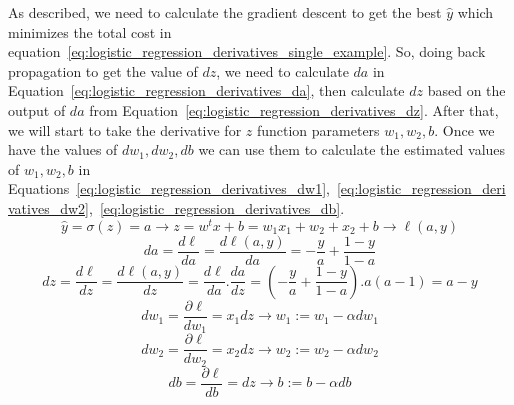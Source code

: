 As described, we need to calculate the gradient descent to get the best $\widehat{y}$ which minimizes the total cost in equation~\eqref{eq:logistic_regression_derivatives_single_example}. So, doing back propagation to get the value of $dz$, we need to calculate $da$ in Equation~\eqref{eq:logistic_regression_derivatives_da}, then calculate $dz$ based on the output of $da$ from Equation~\eqref{eq:logistic_regression_derivatives_dz}. After that, we will start to take the derivative for $z$ function parameters \textbf{\textit{$w_1,w_2,b$}}. Once we have the values of \textbf{\textit{$dw_1,dw_2,db$}} we can use them to calculate the estimated values of \textbf{\textit{$w_1,w_2,b$}} in Equations~\eqref{eq:logistic_regression_derivatives_dw1},~\eqref{eq:logistic_regression_derivatives_dw2},~\eqref{eq:logistic_regression_derivatives_db}.%
%
\begin{equation}\label{eq:logistic_regression_derivatives_single_example}
  \boxed{\widehat{y} = \sigma(z) = a} \longrightarrow \boxed{ z = w^tx + b = w_1x_1+ w_2+x_2+ b} \longrightarrow \boxed{\ell(a,y)}
 \end{equation}
 \begin{equation}\label{eq:logistic_regression_derivatives_da}
   \boxed{da = \frac{d\ell}{da} = \frac{d\ell(a,y)}{da} = - \frac{y}{a} + \frac{1-y}{1-a}}
 \end{equation}
  \begin{equation}\label{eq:logistic_regression_derivatives_dz}
  \boxed{dz = \frac{d\ell}{dz} = \frac{d\ell(a,y)}{dz} = \frac{d\ell}{da} . \frac{da}{dz}} = \boxed{(- \frac{y}{a} + \frac{1-y}{1-a}) . a(a-1) } = \boxed{ a - y  }
 \end{equation}
 \begin{equation}\label{eq:logistic_regression_derivatives_dw1}
   \boxed{dw_1 = \frac{\partial\ell}{dw_1} = x_1 dz} \longrightarrow \boxed{ w_1 := w_1 - \alpha dw_1}
 \end{equation}
  \begin{equation}\label{eq:logistic_regression_derivatives_dw2}
  \boxed{dw_2 = \frac{\partial\ell}{dw_2} = x_2 dz} \longrightarrow \boxed{ w_2 := w_2 - \alpha dw_2}
 \end{equation}
 \begin{equation}\label{eq:logistic_regression_derivatives_db}
  \boxed{db = \frac{\partial\ell}{db} = dz} \longrightarrow \boxed{ b := b - \alpha db}
\end{equation}%
%
